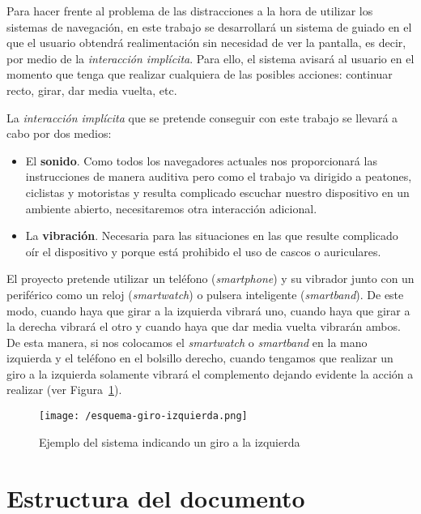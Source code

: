 Para hacer frente al problema de las distracciones a la hora de utilizar los sistemas de navegación,
en este trabajo se desarrollará un sistema de guiado en el que el usuario obtendrá realimentación
sin necesidad de ver la pantalla, es decir, por medio de la \emph{interacción implícita}. Para ello,
el sistema avisará al usuario en el momento que tenga que realizar cualquiera de las posibles
acciones: continuar recto, girar, dar media vuelta, etc.

La \emph{interacción implícita} que se pretende conseguir con este trabajo se llevará a cabo por dos
medios:
\begin{itemize}
  \item El \textbf{sonido}. Como todos los navegadores actuales nos proporcionará las instrucciones
    de manera auditiva pero como el trabajo va dirigido a peatones, ciclistas y motoristas y resulta
    complicado escuchar nuestro dispositivo en un ambiente abierto, necesitaremos otra interacción
    adicional.
  \item La \textbf{vibración}. Necesaria para las situaciones en las que resulte complicado oír el
    dispositivo y porque está prohibido el uso de cascos o auriculares.
\end{itemize}

El proyecto pretende utilizar un teléfono (\emph{smartphone}) y su vibrador junto con un periférico
como un reloj (\emph{smartwatch}) o pulsera inteligente (\emph{smartband}). De este modo, cuando
haya que girar a la izquierda vibrará uno, cuando haya que girar a la derecha vibrará el otro y
cuando haya que dar media vuelta vibrarán ambos. De esta manera, si nos colocamos el
\emph{smartwatch} o \emph{smartband} en la mano izquierda y el teléfono en el bolsillo derecho,
cuando tengamos que realizar un giro a la izquierda solamente vibrará el complemento dejando
evidente la acción a realizar (ver Figura~\ref{fig:giroIzquierda}).

\begin{figure}[!h]
  \begin{center}
    \texttt{[image: /esquema-giro-izquierda.png]}
    \caption{Ejemplo del sistema indicando un giro a la izquierda}
    \label{fig:giroIzquierda}
  \end{center}
\end{figure}


\section{Estructura del documento}

